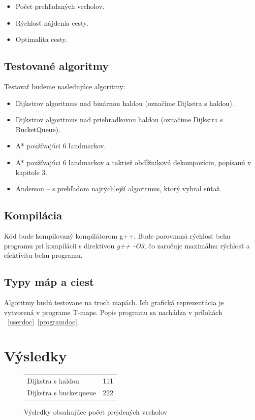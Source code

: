\begin{itemize}
\item Počet prehľadaných vrcholov.
\item Rýchlosť nájdenia cesty.
\item Optimalita cesty. 
\end{itemize}


\subsection{Testované algoritmy}
Testovať budeme nasledujúce algoritmy:
\begin{itemize}
\item Dijkstrov algoritmus nad binárnou haldou (označíme Dijkstra s haldou).
\item Dijkstrov algoritmus nad priehradkovou haldou (označime Dijkstra s BucketQueue).
\item A* používajúci 6 landmarkov.
\item A* používajúci 6 landmarkov a taktiež obdĺžnikovú dekompozíciu, popísanú v kapitole 3.
\item Anderson -- s prehľadom najrýchlejší algoritmus, ktorý vyhral súťaž.
\end{itemize}


\subsection{Kompilácia}
Kód bude kompilovaný kompilátorom g++. Bude porovnaná
rýchlosť behu programu pri kompilácii s direktivou \emph{g++ -O3}, čo zaručuje maximálnu rýchlosť a efektivitu behu programu.

\subsection{Typy máp a ciest}
Algoritmy budú testovane na troch mapách. 
Ich grafická reprezentácia je vytvorená v programe T-maps.
Popis programu sa nachádza v prílohách ~\ref{userdoc}~\ref{programdoc}.


\section{Výsledky}
\begin{figure}[H]
	\begin{tabular}{|l | c|}
	\hline
	Dijkstra s haldou & 111\\
	Dijkstra s bucketqueue & 222\\
	\hline
	\end{tabular}
	\caption{Výsledky obsahujúce počet prejdených vrcholov}
	\label{fig:verticesscanned_result}
\end{figure}


